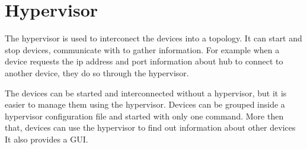 \section{Hypervisor}
\label{sub-sec:hypervisor}

The hypervisor is used to interconect the devices into a topology. It can start and stop devices, 
communicate with to gather information. For example when a device requests the ip address and port
information about hub to connect to another device, they do so through the hypervisor.

The devices can be started and interconnected without a hypervisor, but it is easier to manage them
using the hypervisor. Devices can be grouped inside a hypervisor configuration file and started with
only one command. More then that, devices can use the hypervisor to find out information about other devices
It also provides a GUI.

